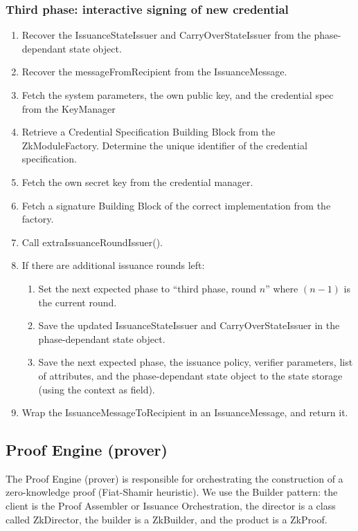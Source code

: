  \subsubsection{Third phase: interactive signing of new credential}
  \begin{enumerate}
  \item Recover the IssuanceStateIssuer and CarryOverStateIssuer from the phase-dependant state object.
  \item Recover the messageFromRecipient from the IssuanceMessage.
  \item Fetch the system parameters, the own public key, and the credential spec from the KeyManager
  \item Retrieve a Credential Specification Building Block from the ZkModuleFactory. Determine the unique identifier
    of the credential specification.
  \item Fetch the own secret key from the credential manager.
  \item Fetch a signature Building Block of the correct implementation from the factory.
  \item Call extraIssuanceRoundIssuer().
  \item If there are additional issuance rounds left:
    \begin{enumerate}
      \item Set the next expected phase to ``third phase, round $n$'' where $(n-1)$ is the current round.
      \item Save the updated IssuanceStateIssuer and CarryOverStateIssuer in the phase-dependant state object.
      \item Save the next expected phase, the issuance policy, verifier parameters, list of attributes,
          and the phase-dependant state object to the state storage (using the context as field).
    \end{enumerate}
  \item Wrap the IssuanceMessageToRecipient in an IssuanceMessage, and return it.
  \end{enumerate}

  \subsection{Proof Engine (prover)}
  The Proof Engine (prover) is responsible for orchestrating the construction of a zero-knowledge proof (Fiat-Shamir heuristic).
  We use the Builder pattern: the client is the Proof Assembler or Issuance Orchestration, the director is a class called ZkDirector,
  the builder is a ZkBuilder, and the product is a ZkProof.

